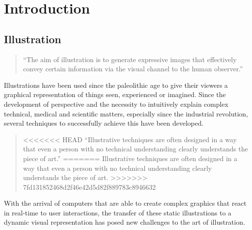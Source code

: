 \chapter{Introduction}
\section{Illustration}
\begin{quote}
``The aim of illustration is to generate expressive images that effectively convey certain information via the visual channel to the human observer.'' \cite{Viola:2005:SVV:2381219.2381249}
\end{quote}

Illustrations have been used since the paleolithic age\cite{Viola:2005:SVV:2381219.2381249} to give their viewers a graphical representation of things seen, experienced or imagined. Since the development of perspective and the necessity to intuitively explain complex technical, medical and scientific matters, especially since the industrial revolution, several techniques to successfully achieve this have been developed.
\begin{quote}
<<<<<<< HEAD
``Illustrative techniques are often designed in a way that even a person with no technical understanding clearly understands the piece of art.'' \cite{Viola:2005:SVV:2381219.2381249}
=======
Illustrative techniques are often designed in a way that even a person with no technical understanding clearly understands the piece of art.\cite{Viola:2005:SVV:2381219.2381249}
>>>>>>> 7fd131852468d2f46e42d5d82f889783c8946632
\end{quote}
With the arrival of computers that are able to create complex graphics that react in real-time to user interactions, the transfer of these static illustrations to a dynamic visual representation has posed new challenges to the art of illustration.\\

